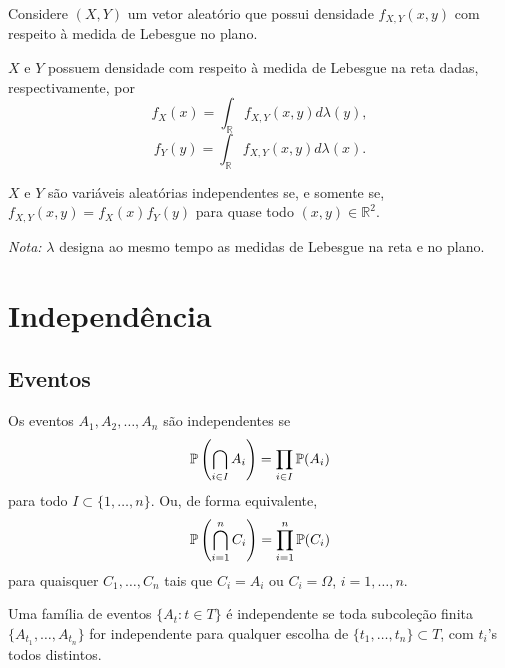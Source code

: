 \begin{theorem}
	Considere $(X, Y)$ um vetor aleatório que possui densidade $f_{X,Y}(x, y)$ com respeito à medida de Lebesgue no plano.
	
	\begin{outline}
		\1[(a)] $X$ e $Y$ possuem densidade com respeito à medida de Lebesgue na reta dadas, respectivamente, por
		\begin{equation}
			f_X(x) = \int_{\mathbb{R}} f_{X,Y}(x, y)d\lambda(y),
		\end{equation}
		\begin{equation}
			f_Y(y) = \int_{\mathbb{R}} f_{X,Y}(x, y)d\lambda(x).
		\end{equation}
		
		\1[(b)] $X$ e $Y$ são variáveis aleatórias independentes se, e somente se, $f_{X,Y}(x, y) = f_X(x)f_Y(y)$ para quase todo $(x, y) \in \mathbb{R}^2$.
	\end{outline}
	
	\textit{Nota:} $\lambda$ designa ao mesmo tempo as medidas de Lebesgue na reta e no plano.
\end{theorem}

\section{Independência}

\subsection{Eventos}

\begin{definition}
	Os eventos $A_1, A_2, \ldots, A_n$ são independentes se
	\begin{equation}
		\P\left(\bigcap_{i\in I}A_i \right) = \prod_{i\in I} \P (A_i)
	\end{equation}
	para todo $I \subset \{1,\ldots,n\}$. Ou, de forma equivalente,
	\begin{equation}
		\P\left(\bigcap_{i=1}^nC_i \right) = \prod_{i=1}^n \P (C_i)
	\end{equation}
	para quaisquer $C_1, \ldots, C_n$ tais que $C_i=A_i$ ou $C_i=\Omega$, $i=1,\ldots, n$.
\end{definition}

\begin{definition}
	Uma família de eventos $\{A_t: t \in T\}$ é independente se toda subcoleção finita $\{A_{t_1}, \ldots, A_{t_n}\}$ for independente para qualquer escolha de $\{t_1, \ldots, t_n\}\subset T$, com $t_i$'s todos distintos.
\end{definition}


